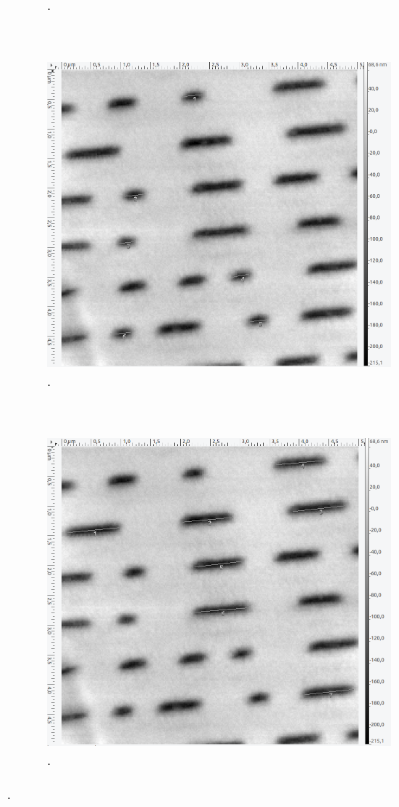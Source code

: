 \begin{figure}[H]
\begin{subfigure}[t]{0.4\textwidth}
	\caption{.}
	\end{subfigure}
	\\
	\begin{subfigure}[t]{0.4\textwidth}
	\includegraphics[width=\textwidth]{AFM_auswertung/dvd_Lmin.png}
	\caption{.}
	\end{subfigure}
	~
	\begin{subfigure}[t]{0.4\textwidth}
	\includegraphics[width=\textwidth]{AFM_auswertung/dvd_Lmax.png}
	\caption{.}
	\end{subfigure}
\caption{.}
\label{abb:DVD}
\end{figure}


